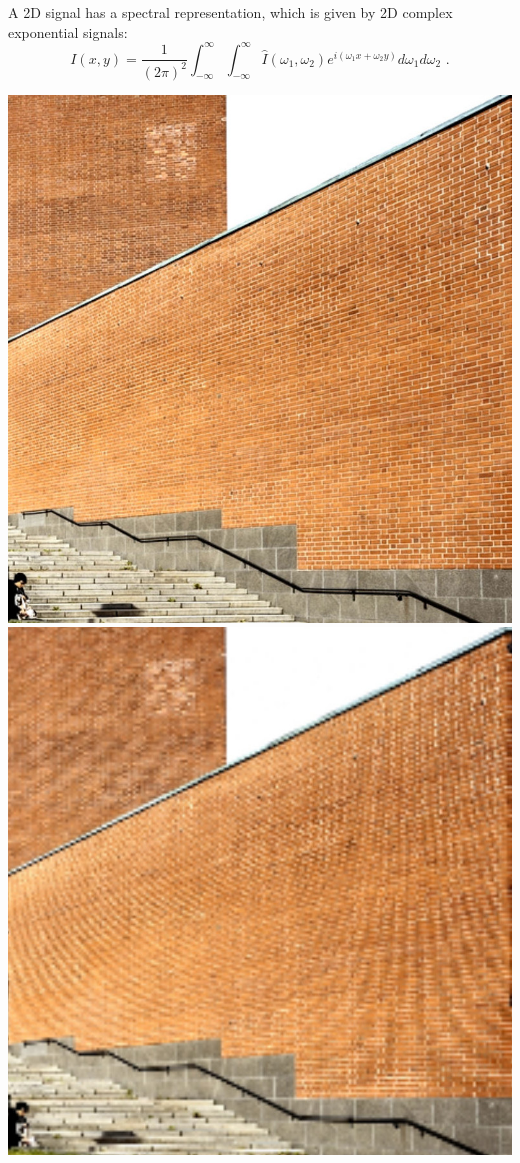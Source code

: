 A 2D signal has a spectral representation, which is given by 2D complex exponential signals:
\begin{equation}
I(x,y) = \frac{1}{(2\pi)^{2}} \int_{-\infty}^{\infty} \int_{-\infty}^{\infty} \hat{I}(\omega_1,\omega_2) e^{i(\omega_1 x + \omega_2 y)} d\omega_1 d\omega_2\,\,.
\end{equation}
\begin{marginfigure}
\begin{center}
\includegraphics[width=\textwidth]{ch09/figures/briko.jpg}
\includegraphics[width=\textwidth]{ch09/figures/brickd.jpg}

\end{center}
\end{marginfigure}

